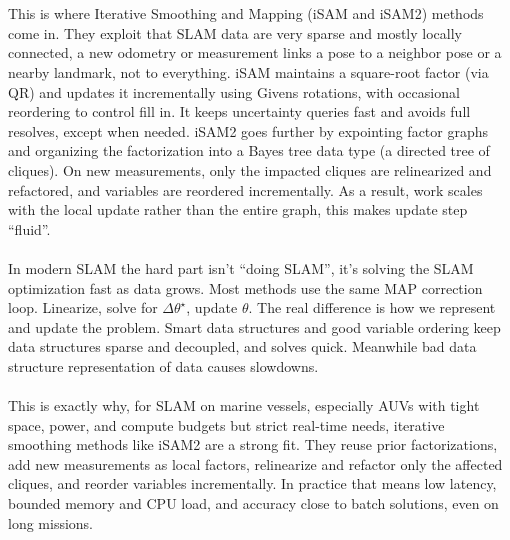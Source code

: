 \\ \\
This is where Iterative Smoothing and Mapping (iSAM and iSAM2) methods come in. They exploit that SLAM data are very sparse and mostly locally connected, a new odometry or measurement links a pose to a neighbor pose or a nearby landmark, not to everything. iSAM maintains a square-root factor (via QR) and updates it incrementally using Givens rotations, with occasional reordering to control fill in. It keeps uncertainty queries fast and avoids full resolves, except when needed. iSAM2 goes further by expointing factor graphs and organizing the factorization into a Bayes tree data type (a directed tree of cliques). On new measurements, only the impacted cliques are relinearized and refactored, and variables are reordered incrementally. As a result, work scales with the local update rather than the entire graph, this makes update step ``fluid''.
\\ \\
In modern SLAM the hard part isn't ``doing SLAM'', it's solving the SLAM optimization fast as data grows. Most methods use the same MAP correction loop. Linearize, solve for $\Delta\theta^\star$, update $\theta$. The real difference is how we represent and update the problem. Smart data structures and good variable ordering keep data structures sparse and decoupled, and solves quick. Meanwhile bad data structure representation of data causes slowdowns.
\\ \\
This is exactly why, for SLAM on marine vessels, especially AUVs with tight space, power, and compute budgets but strict real-time needs, iterative smoothing methods like iSAM2 are a strong fit. They reuse prior factorizations, add new measurements as local factors, relinearize and refactor only the affected cliques, and reorder variables incrementally. In practice that means low latency, bounded memory and CPU load, and accuracy close to batch solutions, even on long missions.